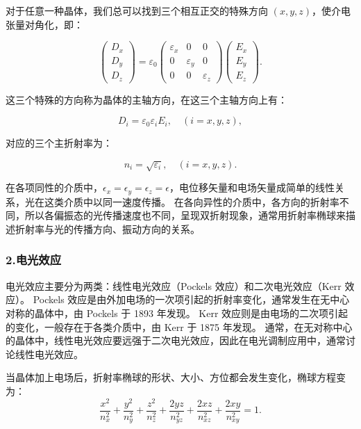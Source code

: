 \documentclass[12pt,a4paper,UTF8]{ctexart}
\begin{document}
	对于任意一种晶体，我们总可以找到三个相互正交的特殊方向 $(x, y, z)$，使介电张量对角化，即：

	\begin{equation}
    	\begin{pmatrix} D_x \\ D_y \\ D_z \end{pmatrix} = \varepsilon_0 \begin{pmatrix} \varepsilon_x & 0 & 0 \\ 0 & \varepsilon_y & 0 \\ 0 & 0 & \varepsilon_z \end{pmatrix} \begin{pmatrix} E_x \\ E_y \\ E_z \end{pmatrix}.
	\end{equation}

	这三个特殊的方向称为晶体的主轴方向，在这三个主轴方向上有：

	\begin{equation}
	    D_i = \varepsilon_0 \varepsilon_i E_i, \quad (i = x, y, z),
	\end{equation}
	
	对应的三个主折射率为：
	
	\begin{equation}
	    n_i = \sqrt{\varepsilon_i}, \quad (i = x, y, z).
	\end{equation}

	在各项同性的介质中，\(\epsilon_{x} = \epsilon_{y} = \epsilon_{z} = \epsilon\)，电位移矢量和电场矢量成简单的线性关系，光在这类介质中以同一速度传播。
	在各向异性的介质中，各方向的折射率不同，所以各偏振态的光传播速度也不同，呈现双折射现象，通常用折射率椭球来描述折射率与光的传播方向、振动方向的关系。

\subsubsection*{2.电光效应}
	电光效应主要分为两类：线性电光效应（Pockels 效应）和二次电光效应（Kerr 效应）。
	Pockels 效应是由外加电场的一次项引起的折射率变化，通常发生在无中心对称的晶体中，由 Pockels 于 1893 年发现。
	Kerr 效应则是由电场的二次项引起的变化，一般存在于各类介质中，由 Kerr 于 1875 年发现。
	通常，在无对称中心的晶体中，线性电光效应要远强于二次电光效应，因此在电光调制应用中，通常讨论线性电光效应。
	
	当晶体加上电场后，折射率椭球的形状、大小、方位都会发生变化，椭球方程变为：
	\begin{equation}
	    \frac{x^2}{n_x^2} + \frac{y^2}{n_y^2} + \frac{z^2}{n_z^2} + \frac{2yz}{n_{yz}^2} + \frac{2xz}{n_{xz}^2} + \frac{2xy}{n_{xy}^2} = 1.
	\end{equation}
\end{document}
